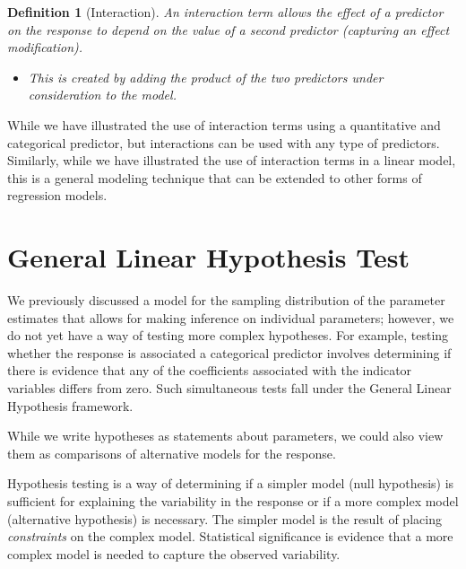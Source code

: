 \documentclass[
]{book}
\providecommand{\tightlist}{%
  \setlength{\itemsep}{0pt}\setlength{\parskip}{0pt}}
\theoremstyle{plain}
\theoremstyle{mydefn}
\newtheorem{definition}{Definition}[chapter]
\theoremstyle{myexmpl}
\theoremstyle{remark}
\begin{document}
\begin{definition}[Interaction]

An interaction term allows the effect of a predictor on the response to depend on the value of a second predictor (capturing an effect modification).

\begin{itemize}
\tightlist
\item
  This is created by adding the product of the two predictors under consideration to the model.
\end{itemize}

\end{definition}

While we have illustrated the use of interaction terms using a quantitative and categorical predictor, but interactions can be used with any type of predictors. Similarly, while we have illustrated the use of interaction terms in a linear model, this is a general modeling technique that can be extended to other forms of regression models.

\hypertarget{glm-linear-hypotheses}{%
\chapter{General Linear Hypothesis Test}\label{glm-linear-hypotheses}}

We previously discussed a model for the sampling distribution of the parameter estimates that allows for making inference on individual parameters; however, we do not yet have a way of testing more complex hypotheses. For example, testing whether the response is associated a categorical predictor involves determining if there is evidence that any of the coefficients associated with the indicator variables differs from zero. Such simultaneous tests fall under the General Linear Hypothesis framework.

While we write hypotheses as statements about parameters, we could also view them as comparisons of alternative models for the response.

\begin{rmdkeyidea}
Hypothesis testing is a way of determining if a simpler model (null hypothesis) is sufficient for explaining the variability in the response or if a more complex model (alternative hypothesis) is necessary. The simpler model is the result of placing \emph{constraints} on the complex model. Statistical significance is evidence that a more complex model is needed to capture the observed variability.
\end{rmdkeyidea}
\end{document}
